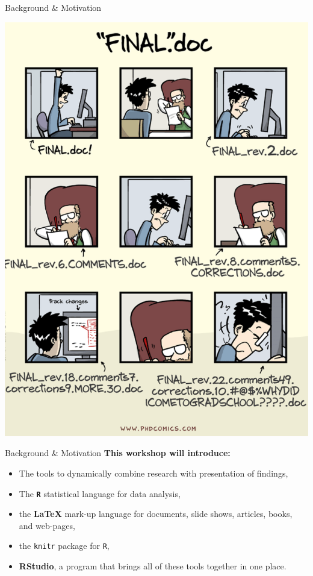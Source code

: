 \documentclass{beamer}\usepackage[]{graphicx}\usepackage[]{color}
\begin{document}
\begin{frame}[t]{Background \& Motivation}
\begin{center}
    \includegraphics[height=0.8\textheight,keepaspectratio]{finaldoc}
  \end{center}
\end{frame}

\begin{frame}[t]{Background \& Motivation}
   \textbf{This workshop will introduce:}
   \begin{itemize}
\item  The tools to dynamically combine research with presentation of findings,\vspace{.5cm}
     \item The \textbf{\texttt{R}} statistical language for data analysis,\vspace{.5cm}
     \item the \textbf{\LaTeX} mark-up language for documents, slide shows, articles, books, and web-pages,\vspace{.5cm}
     \item the \texttt{knitr} package for \texttt{R},\vspace{.5cm}
     \item \textbf{RStudio}, a program that brings all of these tools together in one place.
   \end{itemize}
 \end{frame}
\end{document}
